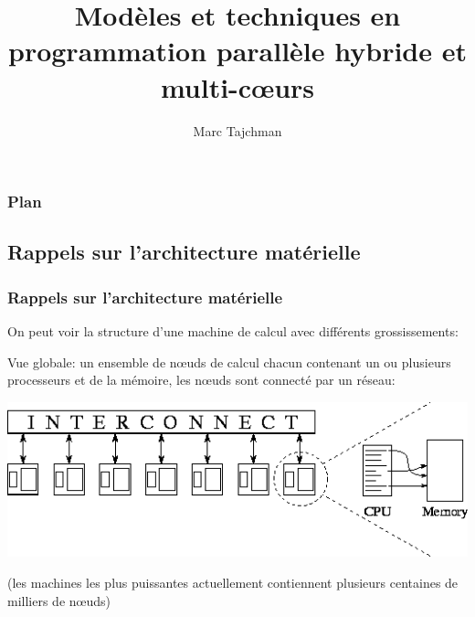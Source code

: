 \documentclass{beamer}
\title{Modèles et techniques en programmation parallèle hybride et multi-c\oe urs}
\author{Marc Tajchman}\institute{CEA - DEN/DM2S/STMF/LMES}
\begin{document}
\begin{frame}
\titlepage
\end{frame}

\Large
\begin{frame}
  	\frametitle{Plan}
  	\tableofcontents
\end{frame}

\begin{frame}
\section{Rappels sur l'architecture matérielle}
\frametitle{Rappels sur l'architecture matérielle}
On peut voir la structure d'une machine de calcul avec diff\'erents grossissements:
\vfill

Vue globale: un ensemble de n\oe uds de calcul chacun contenant un ou plusieurs processeurs et de la m\'emoire, les n\oe uds sont connect\'e par un r\'eseau:

\vfill
\begin{center}
\includegraphics[scale=0.5]{img100}
\end{center}

\vfill
(les machines les plus puissantes actuellement contiennent plusieurs centaines de milliers de n\oe uds)
\end{frame}
\end{document}
